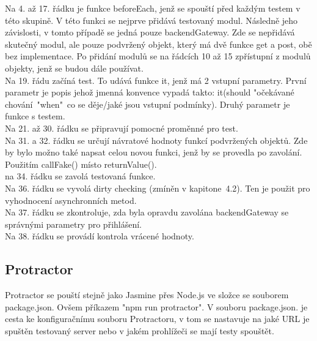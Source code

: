 \documentclass[czech,master,public,dept460,male,cpdeclaration,twoside]{diploma}
\begin{document}
Na 4. až 17. řádku je funkce beforeEach, jenž se spouští před každým testem v této skupině. V této funkci se nejprve přidává testovaný modul. Následně jeho závislosti, v tomto případě se jedná pouze backendGateway. Zde se nepřidává skutečný modul, ale pouze podvržený objekt, který má dvě funkce get a post, obě bez implementace. Po přidání modulů se na řádcích 10 až 15 zpřístupní z modulů objekty, jenž se budou dále používat.\\
Na 19. řádu začíná test. To udává funkce it, jenž má 2 vstupní parametry. První parametr je popis jehož jmenná konvence vypadá takto: it(should "očekávané chování~"when"~co se děje/jaké jsou vstupní podmínky). Druhý parametr je funkce s testem.\\
Na 21. až 30. řádku se připravují pomocné proměnné pro test.\\
Na 31. a 32. řádku se určují návratové hodnoty funkcí podvržených objektů. Zde by bylo možno také napsat celou novou funkci, jenž by se provedla po zavolání. Použitím callFake() místo returnValue().\\
na 34. řádku se zavolá testovaná funkce.\\
Na 36. řádku se vyvolá dirty checking (zmíněn v kapitone~4.2). Ten je použit pro vyhodnocení asynchronních metod.\\
Na 37. řádku se zkontroluje, zda byla opravdu zavolána backendGateway se správnými parametry pro přihlášení.\\
Na 38. řádku se provádí kontrola vrácené hodnoty.\\

\subsection{Protractor}
Protractor se pouští stejně jako Jasmine přes Node.js ve složce se souborem package.json. Ovšem příkazem "npm run protractor". V souboru package.json. je cesta ke konfiguračnímu souboru Protractoru, v tom se nastavuje na jaké URL je spuštěn testovaný server nebo v jakém prohlížeči se mají testy spouštět. 
\end{document}
